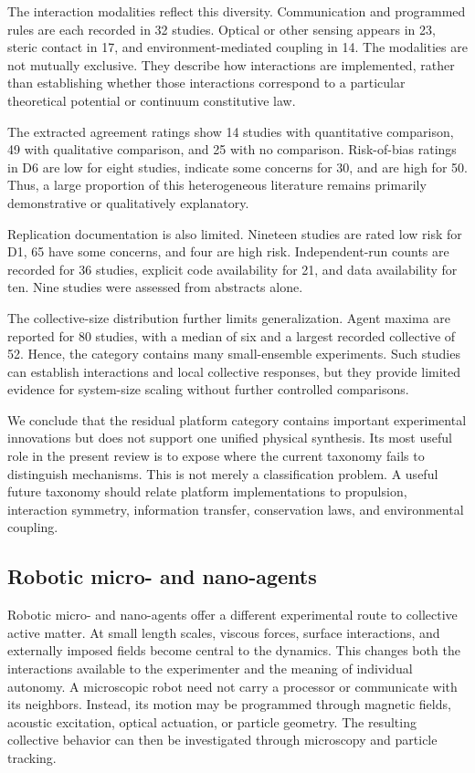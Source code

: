 The interaction modalities reflect
this diversity. Communication and
programmed rules are each recorded
in 32 studies. Optical or other
sensing appears in 23, steric
contact in 17, and
environment-mediated coupling
in 14. The modalities are not
mutually exclusive. They describe
how interactions are implemented,
rather than establishing whether
those interactions correspond to
a particular theoretical potential
or continuum constitutive law.

The extracted agreement ratings
show 14 studies with quantitative
comparison, 49 with qualitative
comparison, and 25 with no
comparison. Risk-of-bias ratings
in D6 are low for eight studies,
indicate some concerns for 30,
and are high for 50. Thus,
a large proportion of this
heterogeneous literature remains
primarily demonstrative or
qualitatively explanatory.

Replication documentation is also
limited. Nineteen studies are
rated low risk for D1, 65 have
some concerns, and four are high
risk. Independent-run counts are
recorded for 36 studies, explicit
code availability for 21, and
data availability for ten.
Nine studies were assessed
from abstracts alone.

The collective-size distribution
further limits generalization.
Agent maxima are reported for
80 studies, with a median of
six and a largest recorded
collective of 52. Hence,
the category contains many
small-ensemble experiments.
Such studies can establish
interactions and local collective
responses, but they provide
limited evidence for system-size
scaling without further
controlled comparisons.

We conclude that the residual
platform category contains
important experimental
innovations but does not support
one unified physical synthesis.
Its most useful role in the
present review is to expose
where the current taxonomy
fails to distinguish mechanisms.
This is not merely a
classification problem.
A useful future taxonomy
should relate platform
implementations to propulsion,
interaction symmetry,
information transfer,
conservation laws, and
environmental coupling.

\subsection{Robotic micro- and nano-agents}
\label{sec:platforms-micro-nano}

Robotic micro- and nano-agents offer a different experimental route
to collective active matter. At small length scales, viscous forces,
surface interactions, and externally imposed fields become central
to the dynamics. This changes both the interactions available to
the experimenter and the meaning of individual autonomy. A
microscopic robot need not carry a processor or communicate with
its neighbors. Instead, its motion may be programmed through
magnetic fields, acoustic excitation, optical actuation, or
particle geometry. The resulting collective behavior can then
be investigated through microscopy and particle tracking.

